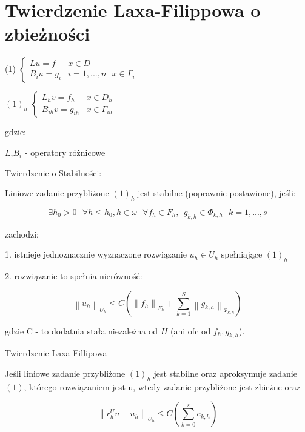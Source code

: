 \section{Twierdzenie Laxa-Filippowa o zbieżności}

(1) $\left\{\begin{matrix} Lu = f & x \in D \\ B_iu = g_i & i = 1,...,n\ \ \ x \in \Gamma _i \end{matrix}\right.$

$(1)_h$ $\left\{\begin{matrix} L_hv = f_h & x \in D_h \\ B_{ih} v = g_{ih} & x \in \Gamma _{ih} \end{matrix}\right.$

gdzie:

$L$,$B_i$ - operatory różnicowe

Twierdzenie o Stabilności:

Liniowe zadanie przybliżone $(1)_h$ jest stabilne (poprawnie postawione), jeśli:

\[ \exists h_0 > 0 \ \ \ \forall h \leqslant h_0 , h \in \omega \ \ \ \forall f_h \in F_h,\ \  g_{k,h} \in \Phi _{k,h}\ \ \ k = 1,...,s\]

zachodzi:

1. istnieje jednoznacznie wyznaczone rozwiązanie $u_h \in U_h$ spełniające $(1)_h$

2. rozwiązanie to spełnia nierówność:

\[ \left \| u_h \right  \|_{U_h} \leqslant C(\left \| f_h \right \|_{F_h} + \sum_{k=1}^S \left \| g_{k,h} \right \|_{\Phi _{k,h}}) \]

gdzie C - to dodatnia stała niezależna od $H$ (ani ofc od $f_h, g_{k,h}$).

Twierdzenie Laxa-Fillipowa

Jeśli liniowe zadanie przybliżone $(1)_h$ jest stabilne oraz aproksymuje zadanie $(1)$, którego rozwiązaniem jest u, wtedy zadanie przybliżone jest zbieżne oraz

\[ \left \| r_h^U u - u_h \right \|_{U_h} \leqslant C(\sum_{k=0}^{s} e_{k,h}) \]